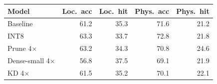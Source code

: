 \begin{tabular}{lrrrr}
\toprule
Model & Loc.\ acc & Loc.\ hit & Phys.\ acc & Phys.\ hit \\
\midrule
Baseline & 61.2 & 35.3 & 71.6 & 21.2 \\
INT8 & 63.3 & 33.7 & 72.8 & 21.8 \\
Prune 4$\times$ & 63.2 & 34.3 & 70.8 & 24.6 \\
Dense-small 4$\times$ & 56.8 & 37.5 & 69.1 & 21.9 \\
KD 4$\times$ & 61.5 & 35.2 & 70.1 & 22.1 \\
\bottomrule
\end{tabular}
